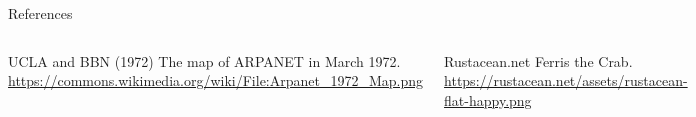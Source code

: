 \begin{frame}{References}
    \begin{columns}[c]


        \footnotesize {
            \begin{thebibliography}{9}

                 UCLA and BBN (1972)
                \newblock The map of ARPANET in March 1972.
                \newblock \url{https://commons.wikimedia.org/wiki/File:Arpanet_1972_Map.png}

            \end{thebibliography}
        }


        \footnotesize {
            \begin{thebibliography}{9}

                 Rustacean.net
                \newblock Ferris the Crab.
                \newblock \url{https://rustacean.net/assets/rustacean-flat-happy.png}

            \end{thebibliography}
        }

    \end{columns}
\end{frame}
